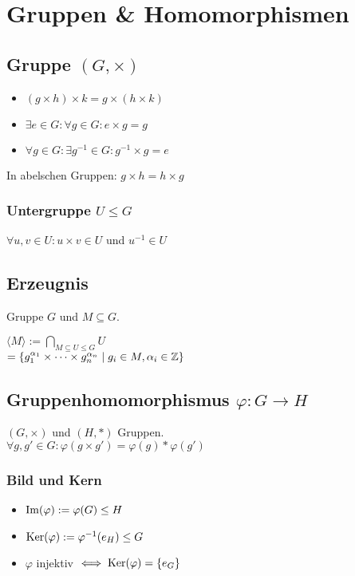 \section*{Gruppen \& Homomorphismen}

\subsection*{Gruppe $(G,\times)$}
\begin{itemize}
	\item $(g \times h) \times k = g \times (h \times k)$
	\item $\exists e \in G: \forall g\in G: e\times g = g$
	\item $\forall g\in G: \exists g^{-1}\in G: g^{-1} \times g = e$
\end{itemize}
In abelschen Gruppen: $g\times h = h \times g$

\subsubsection*{Untergruppe $U\le G$}
$\forall u,v\in U: u\times v \in U$ und $u^{-1}\in U$

\subsection*{Erzeugnis}
Gruppe $G$ und $M \subseteq G$.

$\displaystyle \langle M \rangle := \bigcap_{M\subseteq U \le G}U$ \\
$= \{g_1^{\alpha_1}\times\cdots\times g_n^{\alpha_n} \mid g_i\in M,\alpha_i\in\mathbb{Z}\} $

\subsection*{Gruppenhomomorphismus $\varphi:G \to H$}
$(G, \times)$ und $(H, *)$ Gruppen. \\
$\forall g,g'\in G: \varphi(g\times g')=\varphi(g) * \varphi(g')$

\subsubsection*{Bild und Kern}
\begin{itemize}
	\item $\operatorname{Im}(\varphi):=\varphi(G) \le H$
	\item $\operatorname{Ker}(\varphi) := \varphi^{-1}(e_H) \le G$
	\item $\varphi$ injektiv $\iff \operatorname{Ker}(\varphi)=\{e_G\}$
\end{itemize}

